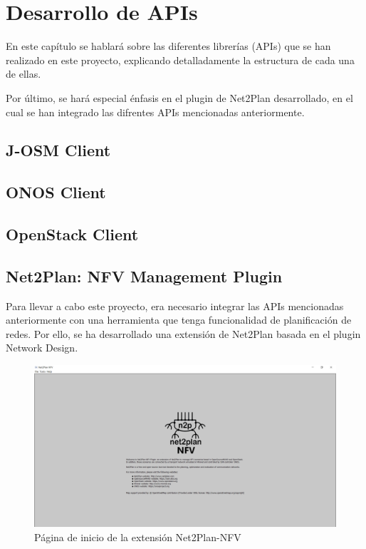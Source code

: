 \chapter{Desarrollo de APIs}

En este capítulo se hablará sobre las diferentes librerías (APIs) que se han realizado en este proyecto, explicando detalladamente la estructura de cada una de ellas.

Por último, se hará especial énfasis en el plugin de Net2Plan desarrollado, en el cual se han integrado las difrentes APIs mencionadas anteriormente.


\section{J-OSM Client}
\label{sec:osmclient}

\section{ONOS Client}
\label{sec:onosclient}

\section{OpenStack Client}
\label{sec:openstackclient}

\section{Net2Plan: NFV Management Plugin}
\label{sec:nfvplugin}

Para llevar a cabo este proyecto, era necesario integrar las APIs mencionadas anteriormente con una herramienta que tenga funcionalidad de planificación de redes. Por ello, se ha desarrollado una extensión de Net2Plan basada en el plugin Network Design.

\begin{figure}[!ht]
	\centering
	\includegraphics[width=0.8\linewidth]{imagenes/nfvpluginmain}
	\caption{Página de inicio de la extensión Net2Plan-NFV}
	\label{fig:nfvpluginmain}
\end{figure}

